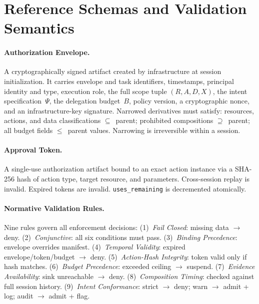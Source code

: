 \documentclass[sigconf,nonacm]{acmart}
\begin{document}
\section{Reference Schemas and Validation Semantics}\label{app:schemas}

\paragraph{Authorization Envelope.} A cryptographically signed artifact created by infrastructure at session initialization. It carries envelope and task identifiers, timestamps, principal identity and type, execution role, the full scope tuple $(R, A, D, X)$, the intent specification~$\Psi$, the delegation budget~$B$, policy version, a cryptographic nonce, and an infrastructure-key signature. Narrowed derivatives must satisfy: resources, actions, and data classifications $\subseteq$~parent; prohibited compositions $\supseteq$~parent; all budget fields $\leq$~parent values. Narrowing is irreversible within a session.

\paragraph{Approval Token.} A single-use authorization artifact bound to an exact action instance via a SHA-256 hash of action type, target resource, and parameters. Cross-session replay is invalid. Expired tokens are invalid. \texttt{uses\_remaining} is decremented atomically.

\paragraph{Normative Validation Rules.} Nine rules govern all enforcement decisions: (1)~\emph{Fail Closed}: missing data $\rightarrow$ deny. (2)~\emph{Conjunctive}: all six conditions must pass. (3)~\emph{Binding Precedence}: envelope overrides manifest. (4)~\emph{Temporal Validity}: expired envelope/token/budget $\rightarrow$ deny. (5)~\emph{Action-Hash Integrity}: token valid only if hash matches. (6)~\emph{Budget Precedence}: exceeded ceiling $\rightarrow$ suspend. (7)~\emph{Evidence Availability}: sink unreachable $\rightarrow$ deny. (8)~\emph{Composition Timing}: checked against full session history. (9)~\emph{Intent Conformance}: strict $\rightarrow$ deny; warn $\rightarrow$ admit + log; audit $\rightarrow$ admit + flag.
\end{document}
